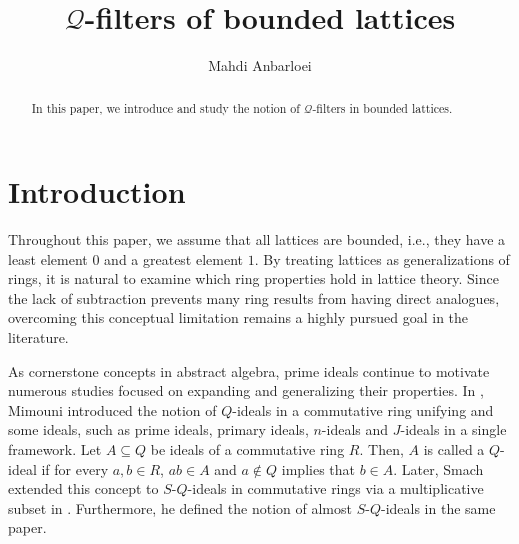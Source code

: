 \documentclass[preprint,review,10pt]{amsart}
\theoremstyle{definition}
\theoremstyle{remark}
\numberwithin{equation}{section}
\begin{document}
\title{$\mathcal{Q}$-filters of bounded lattices}


\author{Mahdi Anbarloei}
\address{Department of Mathematics, Faculty of Sciences,
Imam Khomeini International University, Qazvin, Iran.
}






 

\begin{abstract}
 In this paper, we introduce and study the notion of  $\mathcal{Q}$-filters in  bounded lattices. 

\end{abstract}
\maketitle

\section{Introduction} 
Throughout this paper, we assume that all lattices are bounded, i.e., they have a least element $0$ and a greatest element $1$.  By treating lattices as generalizations of rings, it is natural to examine which ring properties hold in lattice theory. Since the lack of subtraction prevents many ring results from having direct analogues, overcoming this conceptual limitation remains a highly pursued goal in the literature.


As cornerstone concepts in abstract algebra, prime ideals continue to motivate numerous studies focused on expanding and generalizing their properties. In \cite{Mimouni}, Mimouni introduced the notion of $Q$-ideals in a commutative ring unifying  and some ideals, such as prime ideals, primary ideals, $n$-ideals and $J$-ideals in a single framework. Let $A \subseteq Q$ be ideals of a commutative ring $R$. Then, $A$ is called a $Q$-ideal if for every $a,b \in R$, $ab \in A$ and $a \notin Q$ implies that $b \in A$. Later, Smach extended this concept to  $S$-$Q$-ideals in commutative rings via a multiplicative subset in \cite{Smach}. Furthermore, he defined the notion of almost $S$-$Q$-ideals in the same paper. 
\end{document}
